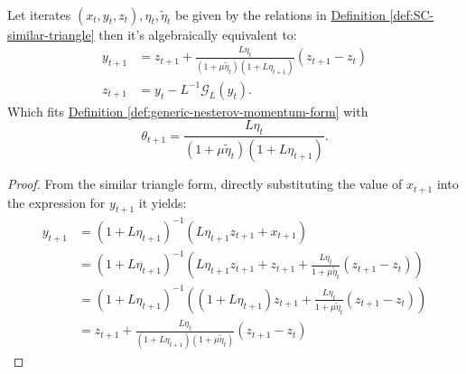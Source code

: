 \documentclass[12pt]{article}
\begin{document}
        \begin{proposition}
            \label{prop:momentum-equiv-to-similar-triangle}
            \;\\
            Let iterates $(x_t, y_t, z_t), \eta_t, \tilde \eta_t$ be given by the relations in 
            \hyperref[def:SC-similar-triangle]
            {Definition \ref*{def:SC-similar-triangle}}
            then it's algebraically equivalent to: 
            \begin{align*}
                y_{t + 1} &= z_{t + 1} + 
                \frac{L\eta_t}{(1 + \mu \tilde\eta_{t})(1 + L\eta_{t + 1})}(z_{t + 1} - z_t)
                \\
                z_{t + 1} &= y_t - L^{-1}\mathcal G_L(y_t). 
            \end{align*}
            Which fits
            \hyperref[def:generic-nesterov-momentum-form]
            {Definition \ref*{def:generic-nesterov-momentum-form}}
            with 
            $$
                \theta_{t + 1} = \frac{L\eta_t}{(1 + \mu \tilde\eta_{t})(1 + L\eta_{t + 1})}.
            $$
        \end{proposition}
        \begin{proof}
            From the similar triangle form, directly substituting the value of $x_{t + 1}$ into the expression for $y_{t + 1}$ it yields: 
            \begin{align*}
                y_{t + 1} &= 
                (1 + L\eta_{t + 1})^{-1} (L\eta_{t + 1}z_{t + 1} + x_{t + 1})
                \\
                &= 
                (1 + L\eta_{t + 1})^{-1}
                \left(
                    L\eta_{t + 1}z_{t + 1} + z_{t + 1} + \frac{L\eta_t}{1 + \mu\tilde \eta_t}(z_{t + 1} - z_t)
                \right)
                \\
                &= 
                (1 + L\eta_{t + 1})^{-1}
                \left(
                    (1 + L\eta_{t + 1})z_{t +1} + 
                    \frac{L\eta_t}{1 + \mu\tilde \eta_t}(z_{t + 1} - z_t)
                \right)
                \\
                &= 
                z_{t + 1} + 
                \frac{L\eta_t}{(1 + L\eta_{t + 1})(1 + \mu\tilde \eta_t)}
                (z_{t + 1} - z_t)
            \end{align*}
        \end{proof}
        
\end{document}
